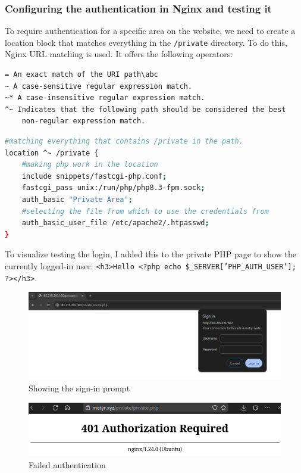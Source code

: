 \documentclass[a4paper]{article}
\newcommand{\abc}{\hfill \break}
\begin{document}
\subsubsection{Configuring the authentication in Nginx and testing it}
To require authentication for a specific area on the website, we need to create a location block that matches everything in the \texttt{/private} directory. To do this, Nginx URL matching is used.\cite{Nginx-url-matching}\abc
It offers the following operators:
\begin{lstlisting}
= An exact match of the URI path\abc
~ A case-sensitive regular expression match.
~* A case-insensitive regular expression match.
^~ Indicates that the following path should be considered the best
    non-regular expression match.
\end{lstlisting}
\begin{lstlisting}[language=bash]
#matching everything that contains /private in the path.
location ^~ /private {
	#making php work in the location
	include snippets/fastcgi-php.conf;
	fastcgi_pass unix:/run/php/php8.3-fpm.sock;
	auth_basic "Private Area";
	#selecting the file from which to use the credentials from
	auth_basic_user_file /etc/apache2/.htpasswd;
}
\end{lstlisting}
To visualize testing the login, I added this to the private PHP page to show the currently logged-in user: \texttt{<h3>Hello <?php echo \$\_SERVER['PHP\_AUTH\_USER']; ?></h3>}.\cite{php-show-basic-auth}
\newpage
\begin{figure}[!htbp]
	\includegraphics[scale=0.25]{images/siginprompt.png}
	\centering
	\caption{Showing the sign-in prompt}
\end{figure}
\begin{figure}[!htbp]
	\includegraphics[scale=0.38]{images/noauth.png}
	\centering
	\caption{Failed authentication}
\end{figure}
\end{document}
